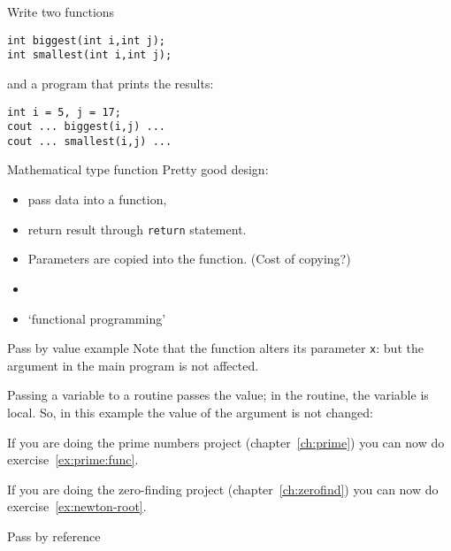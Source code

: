 \begin{exercise}
  \label{ex:swapbyvalue}
  Write two functions
\begin{lstlisting}
int biggest(int i,int j);
int smallest(int i,int j);
\end{lstlisting}
  and a program that prints the results:
\begin{lstlisting}
int i = 5, j = 17;
cout ... biggest(i,j) ...
cout ... smallest(i,j) ...
\end{lstlisting}
\end{exercise}

\begin{slide}{Mathematical type function}
  \label{sl:func-functional}
  Pretty good design:
  \begin{itemize}
  \item pass data into a function,
  \item return result through \lstinline{return} statement.
  \item Parameters are copied into the function. (Cost of copying?)
  \item {}
  \item `functional programming'
  \end{itemize}
\end{slide}

\begin{slide}{Pass by value example}
  \label{sl:func-functional-ex}
  Note that the function alters its parameter \lstinline{x}:
  but the argument in the main program is not affected.
\end{slide}

Passing a variable to a routine passes the value; in the routine, the
variable is local. So, in this example
the value of the argument is not changed:


\begin{exercise}
  If you are doing the prime numbers project (chapter~\ref{ch:prime}) you can
  now do exercise~\ref{ex:prime:func}.
\end{exercise}

\begin{exercise}
  If you are doing the zero-finding project (chapter~\ref{ch:zerofind})
  you can now do exercise~\ref{ex:newton-root}.
\end{exercise}

 {Pass by reference}
\label{sec:pass-by-ref}
  
